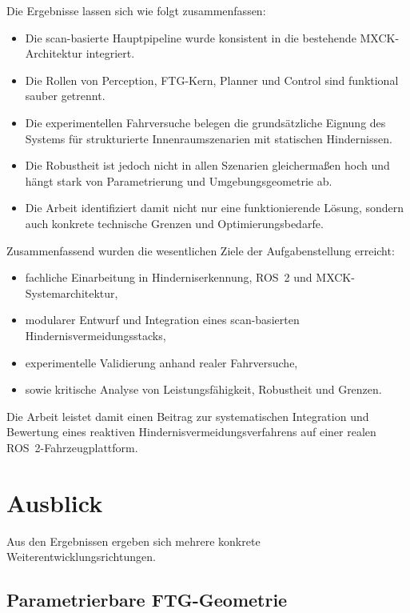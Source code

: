Die Ergebnisse lassen sich wie folgt zusammenfassen:

\begin{itemize}
    \item Die scan-basierte Hauptpipeline wurde konsistent in die bestehende MXCK-Architektur integriert.
    \item Die Rollen von Perception, FTG-Kern, Planner und Control sind funktional sauber getrennt.
    \item Die experimentellen Fahrversuche belegen die grundsätzliche Eignung des Systems für strukturierte Innenraumszenarien mit statischen Hindernissen.
    \item Die Robustheit ist jedoch nicht in allen Szenarien gleichermaßen hoch und hängt stark von Parametrierung und Umgebungsgeometrie ab.
    \item Die Arbeit identifiziert damit nicht nur eine funktionierende Lösung, sondern auch konkrete technische Grenzen und Optimierungsbedarfe.
\end{itemize}

Zusammenfassend wurden die wesentlichen Ziele der Aufgabenstellung erreicht:

\begin{itemize}
    \item fachliche Einarbeitung in Hinderniserkennung, ROS~2 und MXCK-Systemarchitektur,
    \item modularer Entwurf und Integration eines scan-basierten Hindernisvermeidungsstacks,
    \item experimentelle Validierung anhand realer Fahrversuche,
    \item sowie kritische Analyse von Leistungsfähigkeit, Robustheit und Grenzen.
\end{itemize}

Die Arbeit leistet damit einen Beitrag zur systematischen Integration und Bewertung eines reaktiven Hindernisvermeidungsverfahrens auf einer realen ROS~2-Fahrzeugplattform.

\section{Ausblick}

Aus den Ergebnissen ergeben sich mehrere konkrete Weiterentwicklungsrichtungen.

\subsection*{Parametrierbare FTG-Geometrie}

